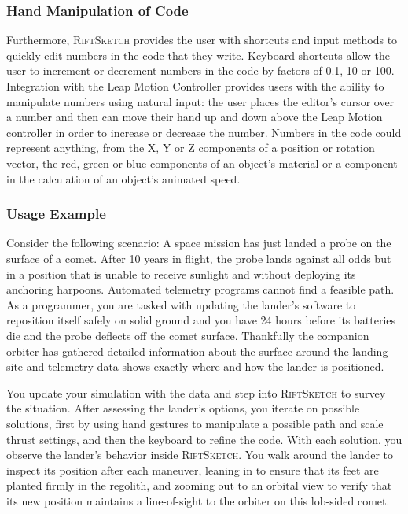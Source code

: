 \documentclass[conference]{IEEEtran}
\begin{document}
\subsubsection{Hand Manipulation of Code}

Furthermore, \textsc{RiftSketch} provides the user with shortcuts and input methods to quickly edit numbers in the code that they write. 
Keyboard shortcuts allow the user to increment or decrement numbers in the code by factors of 0.1, 10 or 100. 
Integration with the Leap Motion Controller provides users with the ability to manipulate numbers using natural input: the user places the editor's cursor over a number and then can move their hand up and down above the Leap Motion controller in order to increase or decrease the number. 
Numbers in the code could represent anything, from the X, Y or Z components of a position or rotation vector, the red, green or blue components of an object's material or a component in the calculation of an object's animated speed.




\subsubsection{Usage Example}
Consider the following scenario: A space mission has just landed a probe on the surface of a comet.
After 10 years in flight, the probe lands against all odds but in a position that is unable to receive sunlight and without deploying its anchoring harpoons.
Automated telemetry programs cannot find a feasible path. As a programmer, you are tasked with updating the lander's software to reposition itself safely on solid ground and you have 24 hours before its batteries die and the probe deflects off the comet surface. Thankfully the companion orbiter has gathered detailed information about the surface around the landing site and telemetry data shows exactly where and how the lander is positioned.

You update your simulation with the data and step into \textsc{RiftSketch} to survey the situation. 
After assessing the lander's options, you iterate on possible solutions, first by using hand gestures to manipulate a possible path and scale thrust settings, 
and then the keyboard to refine the code. With each solution, you observe the lander's behavior inside \textsc{RiftSketch}.
You walk around the lander to inspect its position after each maneuver, leaning in to ensure that its feet are planted firmly in the regolith, and zooming out to an orbital view to verify that its new position maintains a line-of-sight to the orbiter on this lob-sided comet. 
\end{document}
